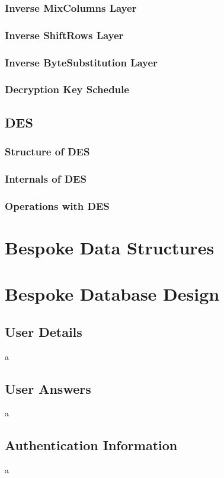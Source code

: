 \subsubsection{Inverse MixColumns Layer}

\subsubsection{Inverse ShiftRows Layer}

\subsubsection{Inverse ByteSubstitution Layer}

\subsubsection{Decryption Key Schedule}


\subsection{DES}
\subsubsection{Structure of DES}
\subsubsection{Internals of DES}
\subsubsection{Operations with DES}

\section{Bespoke Data Structures}

\section{Bespoke Database Design}
\subsection{User Details}
a
\subsection{User Answers}
a
\subsection{Authentication Information}
a
